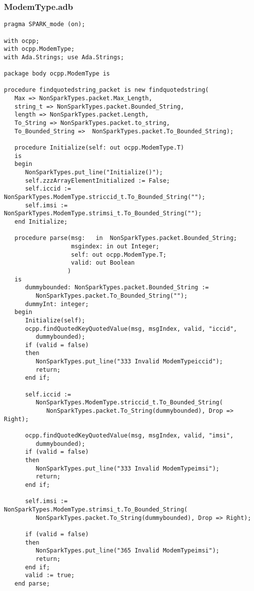 \documentclass[12pt,openany,a4paper]{book}
\begin{document}
\subsubsection{ModemType.adb}
\begin{verbatim}
pragma SPARK_mode (on); 

with ocpp;
with ocpp.ModemType;
with Ada.Strings; use Ada.Strings;

package body ocpp.ModemType is 

procedure findquotedstring_packet is new findquotedstring(
   Max => NonSparkTypes.packet.Max_Length, 
   string_t => NonSparkTypes.packet.Bounded_String, 
   length => NonSparkTypes.packet.Length,
   To_String => NonSparkTypes.packet.to_string,
   To_Bounded_String =>  NonSparkTypes.packet.To_Bounded_String);

   procedure Initialize(self: out ocpp.ModemType.T)
   is
   begin
      NonSparkTypes.put_line("Initialize()");
      self.zzzArrayElementInitialized := False;
      self.iccid := NonSparkTypes.ModemType.striccid_t.To_Bounded_String("");
      self.imsi := NonSparkTypes.ModemType.strimsi_t.To_Bounded_String("");
   end Initialize;

   procedure parse(msg:   in  NonSparkTypes.packet.Bounded_String;
                   msgindex: in out Integer;
                   self: out ocpp.ModemType.T;
                   valid: out Boolean
                  )
   is
      dummybounded: NonSparkTypes.packet.Bounded_String := 
         NonSparkTypes.packet.To_Bounded_String("");
      dummyInt: integer;
   begin
      Initialize(self);
      ocpp.findQuotedKeyQuotedValue(msg, msgIndex, valid, "iccid", 
         dummybounded);
      if (valid = false) 
      then 
         NonSparkTypes.put_line("333 Invalid ModemTypeiccid"); 
         return; 
      end if;

      self.iccid := 
         NonSparkTypes.ModemType.striccid_t.To_Bounded_String(
            NonSparkTypes.packet.To_String(dummybounded), Drop => Right);

      ocpp.findQuotedKeyQuotedValue(msg, msgIndex, valid, "imsi", 
         dummybounded);
      if (valid = false) 
      then 
         NonSparkTypes.put_line("333 Invalid ModemTypeimsi"); 
         return; 
      end if;

      self.imsi := NonSparkTypes.ModemType.strimsi_t.To_Bounded_String(
         NonSparkTypes.packet.To_String(dummybounded), Drop => Right);

      if (valid = false) 
      then 
         NonSparkTypes.put_line("365 Invalid ModemTypeimsi"); 
         return; 
      end if;
      valid := true;
   end parse;


\end{verbatim}
\end{document}

